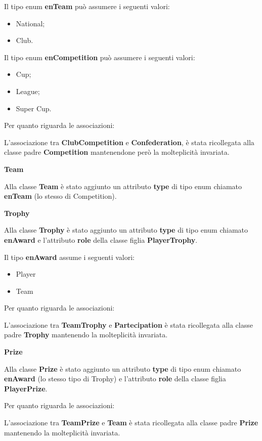 Il tipo enum \textbf{enTeam} può assumere i seguenti valori:
\begin{itemize}
	\item National;
	\item Club.
\end{itemize}

Il tipo enum \textbf{enCompetition} può assumere i seguenti 
valori:
\begin{itemize}
	\item Cup;
	\item League;
	\item Super Cup.
\end{itemize}
Per quanto riguarda le associazioni:

L'associazione tra \textbf{ClubCompetition} e 
\textbf{Confederation}, è stata ricollegata alla classe padre 
\textbf{Competition} mantenendone però la molteplicità 
invariata.

\bigskip
\textbf{Team}
\bigskip

Alla classe \textbf{Team} è stato aggiunto un attributo 
\textbf{type} di tipo enum chiamato \textbf{enTeam} (lo 
stesso di Competition).

\bigskip
\textbf{Trophy}
\bigskip

Alla classe \textbf{Trophy} è stato aggiunto un attributo 
\textbf{type} di tipo enum chiamato \textbf{enAward} e l'attributo
\textbf{role} della classe figlia \textbf{PlayerTrophy}.

Il tipo \textbf{enAward} assume i seguenti valori:
\begin{itemize}
	\item Player
	\item Team
\end{itemize}
Per quanto riguarda le associazioni:

L'associazione tra \textbf{TeamTrophy} e 
\textbf{Partecipation} è stata ricollegata alla classe padre 
\textbf{Trophy} mantenendo la molteplicità invariata.


\bigskip
\textbf{Prize}
\bigskip

Alla classe \textbf{Prize} è stato aggiunto un attributo 
\textbf{type} di tipo enum chiamato \textbf{enAward} (lo 
stesso tipo di Trophy) e l'attributo
\textbf{role} della classe figlia \textbf{PlayerPrize}.

Per quanto riguarda le associazioni:

L'associazione tra \textbf{TeamPrize} e 
\textbf{Team} è stata ricollegata alla classe padre 
\textbf{Prize} mantenendo la molteplicità invariata.

